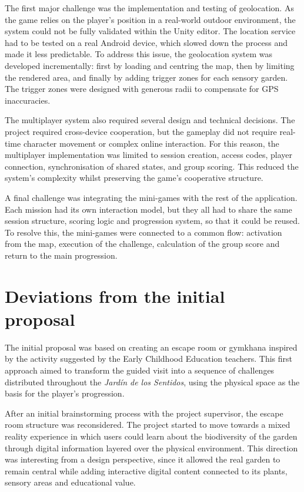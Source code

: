 The first major challenge was the implementation and testing of geolocation. As the game relies on the player’s position in a real-world outdoor environment, the system could not be fully validated within the Unity editor. The location service had to be tested on a real Android device, which slowed down the process and made it less predictable. To address this issue, the geolocation system was developed incrementally: first by loading and centring the map, then by limiting the rendered area, and finally by adding trigger zones for each sensory garden. The trigger zones were designed with generous radii to compensate for GPS inaccuracies.

The multiplayer system also required several design and technical decisions. The project required cross-device cooperation, but the gameplay did not require real-time character movement or complex online interaction. For this reason, the multiplayer implementation was limited to session creation, access codes, player connection, synchronisation of shared states, and group scoring. This reduced the system’s complexity whilst preserving the game’s cooperative structure.

A final challenge was integrating the mini-games with the rest of the application. Each mission had its own interaction model, but they all had to share the same session structure, scoring logic and progression system, so that it could be reused. To resolve this, the mini-games were connected to a common flow: activation from the map, execution of the challenge, calculation of the group score and return to the main progression.

\section{Deviations from the initial proposal}
The initial proposal was based on creating an escape room or gymkhana inspired by the activity suggested by the Early Childhood Education teachers. This first approach aimed to transform the guided visit into a sequence of challenges distributed throughout the \textit{Jardín de los Sentidos}, using the physical space as the basis for the player’s progression.

After an initial brainstorming process with the project supervisor, the escape room structure was reconsidered. The project started to move towards a mixed reality experience in which users could learn about the biodiversity of the garden through digital information layered over the physical environment. This direction was interesting from a design perspective, since it allowed the real garden to remain central while adding interactive digital content connected to its plants, sensory areas and educational value.

